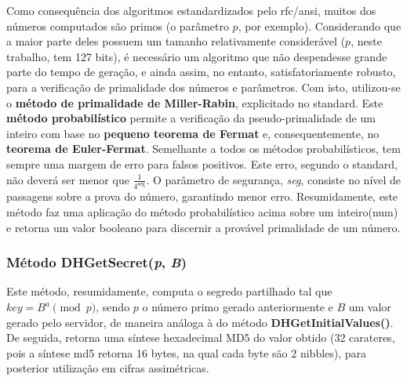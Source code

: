 \documentclass{report}
\begin{document}
Como consequência dos algoritmos estandardizados pelo \ac{rfc}/\ac{ansi}, muitos dos números computados são primos (o parâmetro $p$, por exemplo). Considerando que a maior parte deles possuem um tamanho relativamente considerável ($p$, neste trabalho, tem 127 bits), é necessário um algoritmo que não despendesse grande parte do tempo de geração, e ainda assim, no entanto, satisfatoriamente robusto, para a verificação de primalidade dos números e parâmetros.\newline
Com isto, utilizou-se o \textbf{método de primalidade de Miller-Rabin}\cite{miller}, explicitado no standard. Este \textbf{método probabilístico} permite a verificação da pseudo-primalidade de um inteiro com base no \textbf{pequeno teorema de Fermat}\cite{fermat} e, consequentemente, no \textbf{teorema de Euler-Fermat}\cite{euler}. Semelhante a todos os métodos probabilísticos, tem sempre uma margem de erro para falsos positivos. Este erro, segundo o standard, não deverá ser menor que $\frac{1}{4^{\text{seg}}}$. O parâmetro de segurança, \textit{seg}, consiste no nível de passagens sobre a prova do número, garantindo menor erro.\newline
Resumidamente, este método faz uma aplicação do método probabilístico acima sobre um inteiro(num) e retorna um valor booleano para discernir a provável primalidade de um número.

\subsubsection{Método DHGetSecret(\textit{p}, \textit{B})}
Este método, resumidamente, computa o segredo partilhado tal que $\textit{key}=B^{a}\pmod{p}$, sendo $p$ o número primo gerado anteriormente e $B$ um valor gerado pelo servidor, de maneira análoga à do método \textbf{DHGetInitialValues()}.\newline
De seguida, retorna uma síntese hexadecimal MD5 do valor obtido (32 carateres, pois a síntese \ac{md5} retorna 16 bytes, na qual cada byte são 2 nibbles), para posterior utilização em cifras assimétricas.
\end{document}
